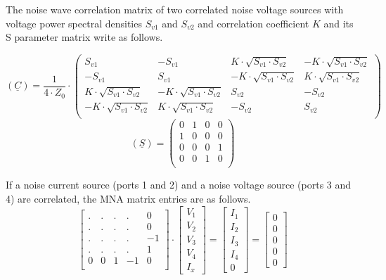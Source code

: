 The noise wave correlation matrix of two correlated noise voltage
sources with voltage power spectral densities $S_{v1}$ and $S_{v2}$
and correlation coefficient $K$ and its S parameter matrix write as
follows.

\begin{equation}
(\underline{C}) = \frac{1}{4\cdot Z_0}\cdot
\begin{pmatrix}
 S_{v1} & -S_{v1} &  K\cdot\sqrt{S_{v1}\cdot S_{v2}} & -K\cdot\sqrt{S_{v1}\cdot S_{v2}} \\
-S_{v1} &  S_{v1} & -K\cdot\sqrt{S_{v1}\cdot S_{v2}} &  K\cdot\sqrt{S_{v1}\cdot S_{v2}} \\
 K\cdot\sqrt{S_{v1}\cdot S_{v2}} & -K\cdot\sqrt{S_{v1}\cdot S_{v2}} &  S_{v2} & -S_{v2} \\
-K\cdot\sqrt{S_{v1}\cdot S_{v2}} &  K\cdot\sqrt{S_{v1}\cdot S_{v2}} & -S_{v2} &  S_{v2} \\
\end{pmatrix}
\end{equation}
\begin{equation}
(\underline{S}) =
\begin{pmatrix}
 0 & 1 & 0 & 0 \\
 1 & 0 & 0 & 0 \\
 0 & 0 & 0 & 1 \\
 0 & 0 & 1 & 0 \\
\end{pmatrix}
\end{equation}


If a noise current source (ports 1 and 2) and a noise voltage
source (ports 3 and 4) are correlated, the MNA matrix entries
are as follows.
\begin{equation}
\begin{bmatrix}
.&.&.&.&  0 \\
.&.&.&.&  0 \\
.&.&.&.& -1 \\
.&.&.&.&  1 \\
0 &  0 & 1 & -1 & 0 \\
\end{bmatrix}
\cdot
\begin{bmatrix}
V_{1}\\
V_{2}\\
V_{3}\\
V_{4}\\
I_x
\end{bmatrix}
=
\begin{bmatrix}
I_{1}\\
I_{2}\\
I_{3}\\
I_{4}\\
0
\end{bmatrix}
=
\begin{bmatrix}
0\\
0\\
0\\
0\\
0
\end{bmatrix}
\end{equation}

